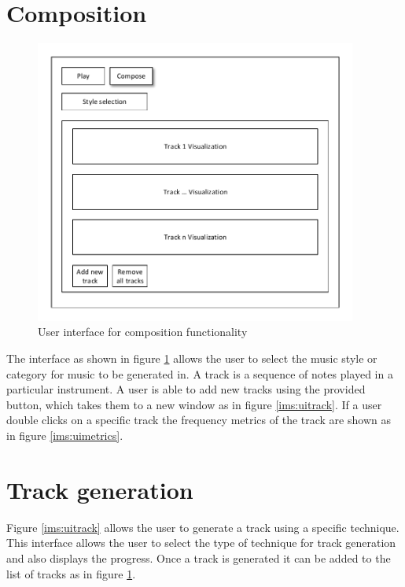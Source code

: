 \section{Composition}
\begin{figure}
\centerline{\includegraphics[width=400px]{../images/ui_compose.pdf}}
\caption{User interface for composition functionality}
\label{ims:uicompose}
\end{figure}


The interface as shown in figure \ref{ims:uicompose} allows the user to select the music style or category for music to be generated in. A track is a sequence of notes played in a particular instrument. A user is able to add new tracks using the provided button, which takes them to a new window as in figure \ref{ims:uitrack}. If a user double clicks on a specific track the frequency metrics of the track are shown as in figure \ref{ims:uimetrics}.


\section{Track generation}

Figure \ref{ims:uitrack} allows the user to generate a track using a specific technique. This interface allows the user to select the type of technique for track generation and also displays the progress. Once a track is generated it can be added to the list of tracks as in figure \ref{ims:uicompose}.

